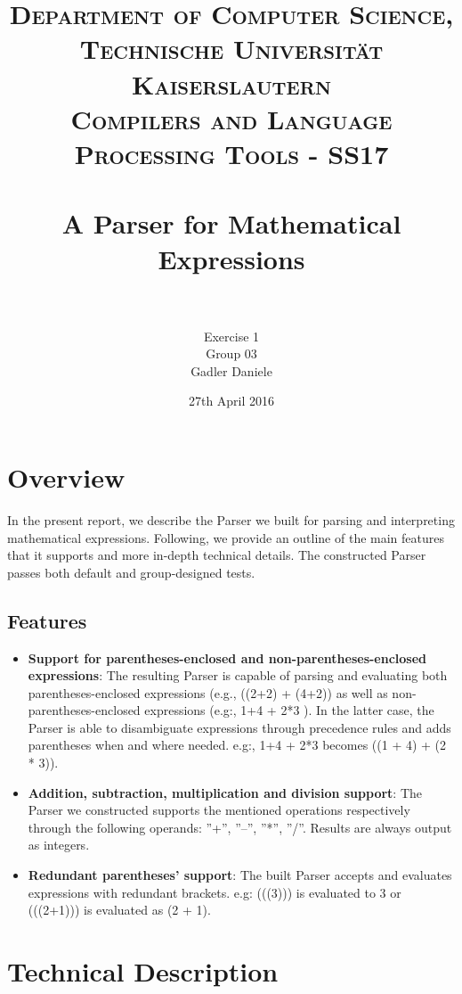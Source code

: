 \documentclass[paper=a4, fontsize=11pt]{scrartcl}
\title{
		\usefont{OT1}{bch}{b}{n}
		\normalfont \normalsize \textsc{Department of Computer Science, Technische Universit\"at Kaiserslautern\\
Compilers and Language Processing Tools - SS17
		} \\ [25pt]
		\horrule{0.5pt} \\[0.4cm]
		\huge A Parser for Mathematical Expressions\\
		\horrule{2pt} \\[0.5cm]
}
\author{	
		Exercise 1\\
		Group 03\\
        Gadler Daniele\\[-1pt]		\normalsize
}
\date{27th April 2016}
\numberwithin{equation}{section}		%
\numberwithin{figure}{section}			%
\numberwithin{table}{section}				%
\begin{document}
\maketitle

\section*{Overview}
In the present report, we describe the Parser we built for parsing and interpreting mathematical expressions. Following, we provide an outline of the main features that it supports and more in-depth technical details. The constructed Parser passes both default and group-designed tests.
\subsection*{Features}

\begin{itemize}
	\item \textbf{Support for parentheses-enclosed and non-parentheses-enclosed expressions}: The resulting Parser is capable of parsing and evaluating both parentheses-enclosed expressions (e.g., ((2+2) + (4+2)) as well as non-parentheses-enclosed expressions (e.g:, 1+4 + 2*3 ). In the latter case, the Parser is able to disambiguate expressions through precedence rules and adds parentheses when and where needed. e.g:, 1+4 + 2*3 becomes ((1 + 4) + (2 * 3)).
	\item \textbf{Addition, subtraction, multiplication and division support}: The Parser we constructed supports the mentioned operations respectively through the following operands: ''+'', ''--'', ''*'', ''/''. Results are always output as integers. 
	\item \textbf{Redundant parentheses' support}: The built Parser accepts and evaluates expressions with redundant brackets. e.g: (((3))) is evaluated to 3 or (((2+1))) is evaluated as (2 + 1).
\end{itemize}


\section*{Technical Description}


\end{document}
